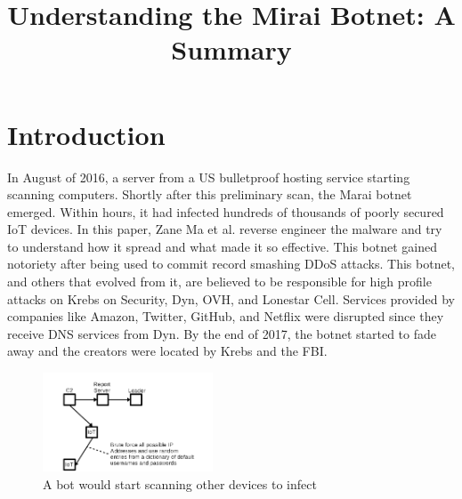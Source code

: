 \documentclass[conference]{IEEEtran}
\begin{document}
\title{Understanding the Mirai Botnet: A Summary}

\author{
}

\maketitle

\section{Introduction}
In August of 2016, a server from a US bulletproof hosting service starting scanning computers. Shortly after this preliminary scan, the Marai botnet emerged. Within hours, it had infected hundreds of thousands of poorly secured IoT devices. In this paper, Zane Ma et al. reverse engineer the malware and try to understand how it spread and what made it so effective. This botnet gained notoriety after being used to commit record smashing DDoS attacks. This botnet, and others that evolved from it, are believed to be responsible for high profile attacks on Krebs on Security, Dyn, OVH, and Lonestar Cell. Services provided by companies like Amazon, Twitter, GitHub, and Netflix were disrupted since they receive DNS services from Dyn. By the end of 2017, the botnet started to fade away and the creators were located by Krebs and the FBI.

\begin{figure}[b]
\centerline{\includegraphics[width=0.45\textwidth]{../fig1.png}}
\caption{A bot would start scanning other devices to infect}
\label{scan}
\end{figure}
\end{document}
